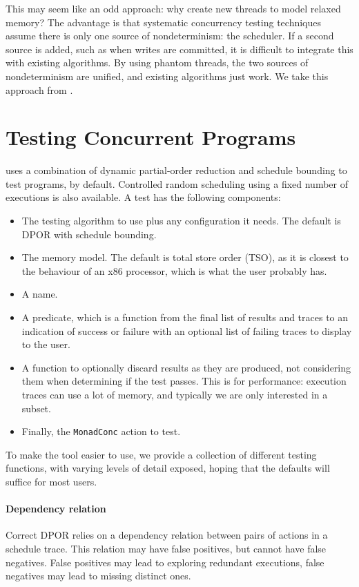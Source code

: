 This may seem like an odd approach: why create new threads to model relaxed
memory?  The advantage is that systematic concurrency testing techniques assume
there is only one source of nondeterminism: the scheduler.  If a second source
is added, such as when writes are committed, it is difficult to integrate this
with existing algorithms.  By using phantom threads, the two sources of
nondeterminism are unified, and existing algorithms just work.  We take this
approach from \cite{zhang2015}.

\section{Testing Concurrent Programs}
\label{sec:dejafu-testing}

\dejafu{} uses a combination of dynamic partial-order reduction and
schedule bounding to test programs, by default.  Controlled random
scheduling using a fixed number of executions is also available.  A
\dejafu{} test has the following components:

\begin{itemize}
\item The testing algorithm to use plus any configuration it needs.
  The default is DPOR with schedule bounding.
\item The memory model.  The default is total store order (TSO), as it
  is closest to the behaviour of an x86 processor\cite{owens2009},
  which is what the user probably has.
\item A name.
\item A predicate, which is a function from the final list of results
  and traces to an indication of success or failure with an optional
  list of failing traces to display to the user.
\item A function to optionally discard results as they are produced,
  not considering them when determining if the test passes.  This is
  for performance: execution traces can use a lot of memory, and
  typically we are only interested in a subset.
\item Finally, the \verb|MonadConc| action to test.
\end{itemize}

To make the tool easier to use, we provide a collection of different
testing functions, with varying levels of detail exposed, hoping that
the defaults will suffice for most users.

\paragraph{Dependency relation}
Correct DPOR relies on a dependency relation between pairs of actions
in a schedule trace.  This relation may have false positives, but
cannot have false negatives.  False positives may lead to exploring
redundant executions, false negatives may lead to missing distinct
ones.

